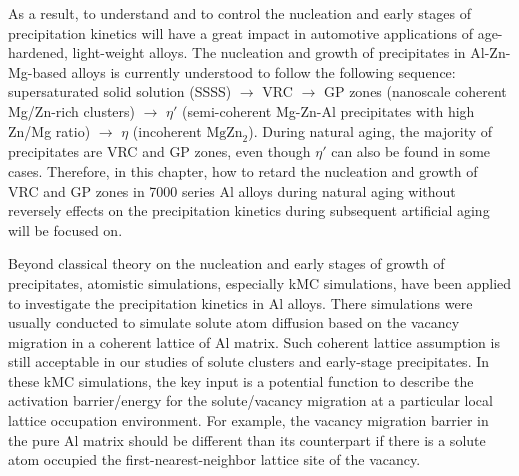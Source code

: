 As a result, to understand and to control the nucleation and early stages of precipitation kinetics will have a great impact in automotive applications of age-hardened, light-weight alloys\cite{deschamps1998influence,banhart2011kinetics,liang2012kinetics,deschamps2014precipitation}. The nucleation and growth of precipitates in Al-Zn-Mg-based alloys is currently understood to follow the following sequence: supersaturated solid solution (SSSS) $\rightarrow$ \acf{VRC} $\rightarrow$ \acf{GP} zones (nanoscale coherent Mg/Zn-rich clusters) $\rightarrow$ $\eta'$ (semi-coherent Mg-Zn-Al precipitates with high Zn/Mg ratio) $\rightarrow$ $\eta$ (incoherent $\text{MgZn}_\text{2}$)\cite{ragueneau2000review,deschamps2014precipitation,berg2001gp,chung2018transmission}. During natural aging, the majority of precipitates are \ac{VRC} and \ac{GP} zones, even though $\eta'$ can also be found in some cases\cite{mukhopadhyay1994guinier}. Therefore, in this chapter, how to retard the nucleation and growth of \ac{VRC} and \ac{GP} zones in 7000 series Al alloys during natural aging without reversely effects on the precipitation kinetics during subsequent artificial aging will be focused on. 

Beyond classical theory on the nucleation and early stages of growth of precipitates, atomistic simulations, especially \acf{kMC} simulations, have been applied to investigate the precipitation kinetics in Al alloys\cite{clouet2006kinetic,soisson2010atomistic,soisson1996monte,liang2012kinetics,sha2005kinetic,clouet2004nucleation,vincent2008precipitation,hirosawa1998comparison,sanchez1984generalized}. There simulations were usually conducted to simulate solute atom diffusion based on the vacancy migration in a coherent lattice of Al matrix. Such coherent lattice assumption is still acceptable in our studies of solute clusters and early-stage precipitates. In these \ac{kMC} simulations, the key input is a potential function to describe the activation barrier/energy for the solute/vacancy migration at a particular local lattice occupation environment. For example, the vacancy migration barrier in the pure Al matrix should be different than its counterpart if there is a solute atom occupied the first-nearest-neighbor lattice site of the vacancy.

